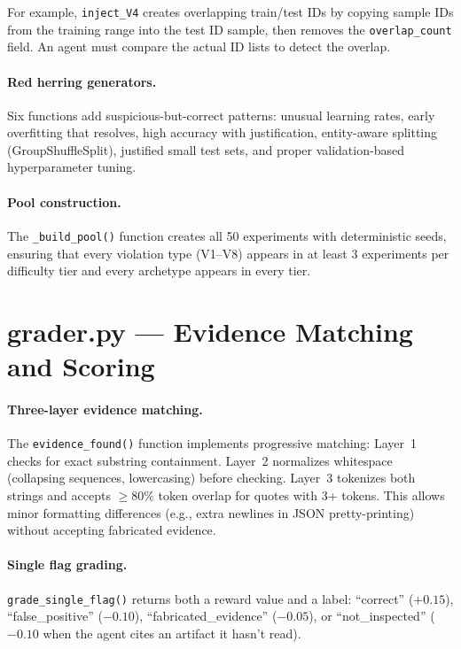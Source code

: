 \documentclass{article}
\begin{document}
For example, \texttt{inject\_V4} creates overlapping train/test IDs by
copying sample IDs from the training range into the test ID sample, then
removes the \texttt{overlap\_count} field.  An agent must compare the
actual ID lists to detect the overlap.

\paragraph{Red herring generators.}
Six functions add suspicious-but-correct patterns: unusual learning rates,
early overfitting that resolves, high accuracy with justification,
entity-aware splitting (GroupShuffleSplit), justified small test sets,
and proper validation-based hyperparameter tuning.

\paragraph{Pool construction.}
The \texttt{\_build\_pool()} function creates all 50 experiments with
deterministic seeds, ensuring that every violation type (V1--V8) appears
in at least 3 experiments per difficulty tier and every archetype appears
in every tier.

\section{grader.py --- Evidence Matching and Scoring}

\paragraph{Three-layer evidence matching.}
The \texttt{evidence\_found()} function implements progressive matching:
Layer~1 checks for exact substring containment.  Layer~2 normalizes
whitespace (collapsing sequences, lowercasing) before checking.  Layer~3
tokenizes both strings and accepts $\geq80\%$ token overlap for quotes
with 3+ tokens.  This allows minor formatting differences (e.g., extra
newlines in JSON pretty-printing) without accepting fabricated evidence.

\paragraph{Single flag grading.}
\texttt{grade\_single\_flag()} returns both a reward value and a label:
``correct'' ($+0.15$), ``false\_positive'' ($-0.10$), ``fabricated\_evidence''
($-0.05$), or ``not\_inspected'' ($-0.10$ when the agent cites an artifact
it hasn't read).
\end{document}
